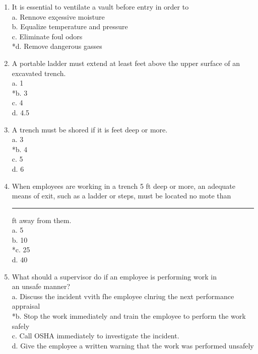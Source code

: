 \begin{enumerate}[1.]
\item It is essential to ventilate a vault before entry in order to\\
a. Rennove exçessive moisture\\
b. Equalize temperature and pressure\\
c. Eliminate foul odors\\
*d. Remove dangerous gasses\\
\item A portable ladder must extend at least feet above the upper surface of an excavated trench.\\
a. 1\\
*b. 3\\
c. 4\\
d. 4.5\\
\item A trench must be shored if it is feet deep or more.\\
a. 3\\
*b. 4\\
c. 5\\
d. 6\\
\item When employees are working in a trench 5 ft deep or more, an adequate means of exit, such as a ladder or steps, must be located no mote than \rule{2cm}{2pt} ft away from them.\\
a. 5\\
b. 10\\
*c. 25\\
d. 40\\

\item What should a supervisor do if an employee is performing work in\\
an unsafe manner?\\
a.	Discuss the incident vvith fhe employee clnriug the next performance appraisal\\
*b.	Stop the work immediately and train the employee to perform the work safely\\
c.	Call OSHA immediately to investigate the incident. \\
d.	Give the employee a written warning that the work was performed unsafely\\


\end{enumerate}
